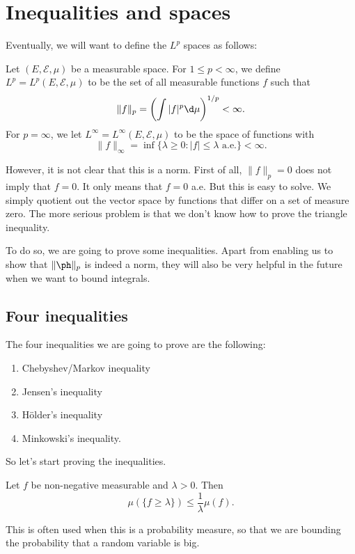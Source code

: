 \documentclass[a4paper]{article}
\begin{document}
\section{Inequalities and  spaces}
Eventually, we will want to define the $L^p$ spaces as follows:
\begin{defi}[$L^p$ spaces]
  Let $(E, \mathcal{E}, \mu)$ be a measurable space. For $1 \leq p < \infty$, we define $L^p = L^p(E, \mathcal{E}, \mu)$ to be the set of all measurable functions $f$ such that
  \[
    \|f\|_p = \left(\int |f|^p \d \mu\right)^{1/p} < \infty.
  \]
  For $p = \infty$, we let $L^\infty = L^\infty(E, \mathcal{E}, \mu)$ to be the space of functions with
  \[
    \|f\|_{\infty} = \inf \{\lambda \geq 0: |f| \leq \lambda \text{ a.e.}\} < \infty.
  \]
\end{defi}
However, it is not clear that this is a norm. First of all, $\|f\|_p = 0$ does not imply that $f = 0$. It only means that $f = 0$ a.e. But this is easy to solve. We simply quotient out the vector space by functions that differ on a set of measure zero. The more serious problem is that we don't know how to prove the triangle inequality.

To do so, we are going to prove some inequalities. Apart from enabling us to show that $\| \ph \|_p$ is indeed a norm, they will also be very helpful in the future when we want to bound integrals.

\subsection{Four inequalities}
The four inequalities we are going to prove are the following:
\begin{enumerate}
  \item Chebyshev/Markov inequality
  \item Jensen's inequality
  \item H\"older's inequality
  \item Minkowski's inequality.
\end{enumerate}

So let's start proving the inequalities.
\begin{prop}
  Let $f$ be non-negative measurable and $\lambda > 0$. Then
  \[
    \mu(\{f \geq \lambda\}) \leq \frac{1}{\lambda} \mu(f).
  \]
\end{prop}
This is often used when this is a probability measure, so that we are bounding the probability that a random variable is big.
\end{document}
